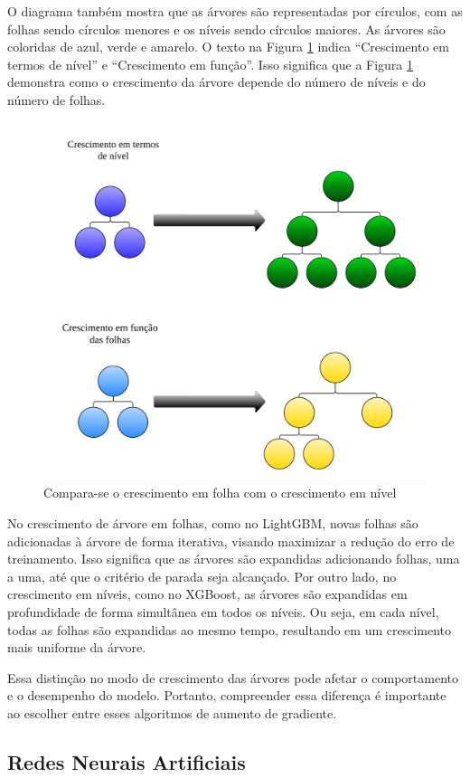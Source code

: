 O diagrama também mostra que as árvores são representadas por círculos, com as folhas sendo círculos menores e os níveis sendo círculos maiores. As árvores são coloridas de azul, verde e amarelo.
O texto na Figura \ref{fig:xgboost} indica ``Crescimento em termos de nível'' e ``Crescimento em função''. Isso significa que a Figura \ref{fig:xgboost}  demonstra como o crescimento da árvore depende do número de níveis e do número de folhas.

\begin{figure}[H]
	\centering
	\caption{Compara-se o crescimento em folha com o crescimento em nível}
	\label{fig:xgboost}
	\includegraphics[width=0.7\linewidth]{Modelos/Figuras/xgboost}
	
\end{figure}


No crescimento de árvore em folhas, como no LightGBM, novas folhas são adicionadas à árvore de forma iterativa, visando maximizar a redução do erro de treinamento. Isso significa que as árvores são expandidas adicionando folhas, uma a uma, até que o critério de parada seja alcançado.
Por outro lado, no crescimento em níveis, como no XGBoost, as árvores são expandidas em profundidade de forma simultânea em todos os níveis. Ou seja, em cada nível, todas as folhas são expandidas ao mesmo tempo, resultando em um crescimento mais uniforme da árvore.

Essa distinção no modo de crescimento das árvores pode afetar o comportamento e o desempenho do modelo. Portanto, compreender essa diferença é importante ao escolher entre esses algoritmos de aumento de gradiente.


\subsection{Redes Neurais Artificiais }


